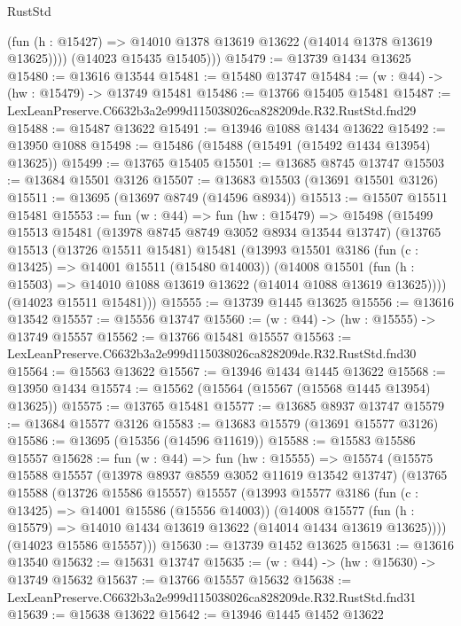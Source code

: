 \begin{lexlean}{RustStd}
\begin{coremodule}
            (fun (h : @15427) => @14010 @1378 @13619 @13622 (@14014 @1378 @13619 @13625))))
        (@14023 @15435 @15405)))
@15479 := @13739 @1434 @13625
@15480 := @13616 @13544
@15481 := @15480 @13747
@15484 := (w : @44) -> (hw : @15479) -> @13749 @15481
@15486 := @13766 @15405 @15481
@15487 := LexLeanPreserve.C6632b3a2e999d115038026ca828209de.R32.RustStd.fnd29
@15488 := @15487 @13622
@15491 := @13946 @1088 @1434 @13622
@15492 := @13950 @1088
@15498 := @15486 (@15488 (@15491 (@15492 @1434 @13954) @13625))
@15499 := @13765 @15405
@15501 := @13685 @8745 @13747
@15503 := @13684 @15501 @3126
@15507 := @13683 @15503 (@13691 @15501 @3126)
@15511 := @13695 (@13697 @8749 (@14596 @8934))
@15513 := @15507 @15511 @15481
@15553 := fun (w : @44) =>
  fun (hw : @15479) =>
  @15498
    (@15499
      @15513
      @15481
      (@13978 @8745 @8749 @3052 @8934 @13544 @13747)
      (@13765
        @15513
        (@13726 @15511 @15481)
        @15481
        (@13993
          @15501
          @3186
          (fun (c : @13425) => @14001 @15511 (@15480 @14003))
          (@14008
            @15501
            (fun (h : @15503) => @14010 @1088 @13619 @13622 (@14014 @1088 @13619 @13625))))
        (@14023 @15511 @15481)))
@15555 := @13739 @1445 @13625
@15556 := @13616 @13542
@15557 := @15556 @13747
@15560 := (w : @44) -> (hw : @15555) -> @13749 @15557
@15562 := @13766 @15481 @15557
@15563 := LexLeanPreserve.C6632b3a2e999d115038026ca828209de.R32.RustStd.fnd30
@15564 := @15563 @13622
@15567 := @13946 @1434 @1445 @13622
@15568 := @13950 @1434
@15574 := @15562 (@15564 (@15567 (@15568 @1445 @13954) @13625))
@15575 := @13765 @15481
@15577 := @13685 @8937 @13747
@15579 := @13684 @15577 @3126
@15583 := @13683 @15579 (@13691 @15577 @3126)
@15586 := @13695 (@15356 (@14596 @11619))
@15588 := @15583 @15586 @15557
@15628 := fun (w : @44) =>
  fun (hw : @15555) =>
  @15574
    (@15575
      @15588
      @15557
      (@13978 @8937 @8559 @3052 @11619 @13542 @13747)
      (@13765
        @15588
        (@13726 @15586 @15557)
        @15557
        (@13993
          @15577
          @3186
          (fun (c : @13425) => @14001 @15586 (@15556 @14003))
          (@14008
            @15577
            (fun (h : @15579) => @14010 @1434 @13619 @13622 (@14014 @1434 @13619 @13625))))
        (@14023 @15586 @15557)))
@15630 := @13739 @1452 @13625
@15631 := @13616 @13540
@15632 := @15631 @13747
@15635 := (w : @44) -> (hw : @15630) -> @13749 @15632
@15637 := @13766 @15557 @15632
@15638 := LexLeanPreserve.C6632b3a2e999d115038026ca828209de.R32.RustStd.fnd31
@15639 := @15638 @13622
@15642 := @13946 @1445 @1452 @13622

\end{coremodule}
\end{lexlean}
